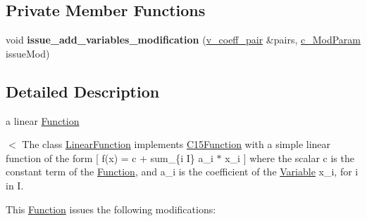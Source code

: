 \subsection*{Private Member Functions}
\begin{DoxyCompactItemize}
\item 
\mbox{\label{class_s_m_spp__di__unipi__it_1_1_linear_function_a4a09529c07b01a2d706c277c81c47bdd}} 
void {\bfseries issue\+\_\+add\+\_\+variables\+\_\+modification} (\mbox{\hyperlink{class_s_m_spp__di__unipi__it_1_1_linear_function_aee8988faa66c7c9013613e2c76580ddf}{v\+\_\+coeff\+\_\+pair}} \&pairs, \mbox{\hyperlink{group___modification___t_y_p_e_s_ga544246d8c462e9a2d817c2c30797968f}{c\+\_\+\+Mod\+Param}} issue\+Mod)
\end{DoxyCompactItemize}


\subsection{Detailed Description}
a linear \mbox{\hyperlink{class_s_m_spp__di__unipi__it_1_1_function}{Function}} 

$<$ The class \mbox{\hyperlink{class_s_m_spp__di__unipi__it_1_1_linear_function}{Linear\+Function}} implements \mbox{\hyperlink{class_s_m_spp__di__unipi__it_1_1_c15_function}{C15\+Function}} with a simple linear function of the form \mbox{[} f(x) = c + sum\+\_\+\{i  I\} a\+\_\+i $\ast$ x\+\_\+i \mbox{]} where the scalar c is the constant term of the \mbox{\hyperlink{class_s_m_spp__di__unipi__it_1_1_function}{Function}}, and a\+\_\+i is the coefficient of the \mbox{\hyperlink{class_s_m_spp__di__unipi__it_1_1_variable}{Variable}} x\+\_\+i, for i in I.

This \mbox{\hyperlink{class_s_m_spp__di__unipi__it_1_1_function}{Function}} issues the following modifications\+:


